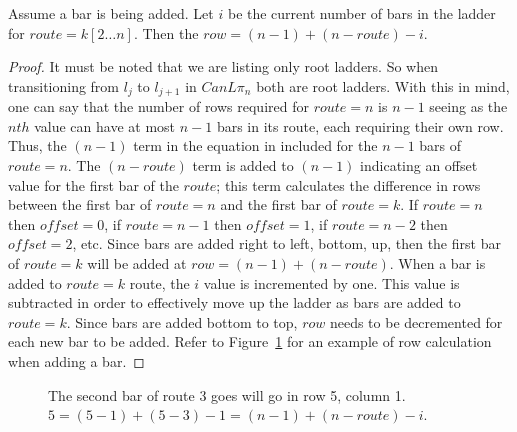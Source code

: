 
\begin{lemma}
  Assume a bar is being added. Let $i$ be the current number of bars in the ladder for $route=k[2 \dots n]$.
  Then the $row=(n-1)+(n-route)-i$.
\end{lemma}
\begin{proof}
   It must be noted that we are listing only root ladders. So when transitioning from 
$l_{j}$ to $l_{j+1}$ in $CanL{\pi_{n}}$ both are root ladders. With this in mind, one can say that the 
number of rows required for $route=n$ is $n-1$ seeing as the $nth$ value can have at most $n-1$ bars in its route, 
each requiring  their own 
row. Thus, the $(n-1)$ term in the equation in included for the $n-1$ bars of 
$route=n$. The $(n-route)$ term is added to $(n-1)$ indicating 
an offset value for the first bar of the $route$; this term calculates 
the difference in rows between the first bar of $route=n$ 
and the first bar of $route=k$. If $route=n$ 
then $offset=0$, if $route=n-1$ then $offset=1$, if $route=n-2$ then $offset=2$, etc.
Since bars are added right to left, bottom, up, then the first bar of $route=k$ will be added 
at $row=(n-1)+(n-route)$. When a bar is added to $route=k$ route, the $i$ value is incremented by one. This value is subtracted in 
order to effectively move up the ladder as bars are added to $route=k$. Since bars are added 
bottom to top, $row$ needs to be decremented for each new bar to be added. Refer to Figure~\ref{Fig:SJTcase1} for an example of 
row calculation when adding a bar.
\end{proof}
\begin{figure}[!htp]
  \begin{center}
    

\end{center}
\caption{The second bar of route 3 goes will go in row 5, column 1. $5 = (5-1)+(5-3)-1 = (n-1)+(n-route)-i$.}
\label{Fig:SJTcase1}
\end{figure}
\pagebreak



